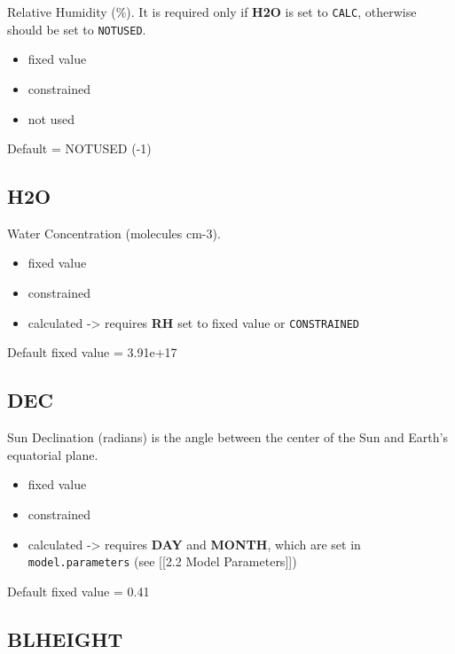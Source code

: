 Relative Humidity (\%). It is required only if \textbf{H2O} is set to
\texttt{CALC}, otherwise should be set to \texttt{NOTUSED}.

\begin{itemize}
\tightlist
\item
  fixed value
\item
  constrained
\item
  not used
\end{itemize}

Default = NOTUSED (-1)

\hypertarget{h2o}{%
\subsection{H2O}\label{h2o}}

Water Concentration (molecules cm-3).

\begin{itemize}
\tightlist
\item
  fixed value
\item
  constrained
\item
  calculated -\textgreater{} requires \textbf{RH} set to fixed value or
  \texttt{CONSTRAINED}
\end{itemize}

Default fixed value = 3.91e+17

\hypertarget{dec}{%
\subsection{DEC}\label{dec}}

Sun Declination (radians) is the angle between the center of the Sun and
Earth's equatorial plane.

\begin{itemize}
\tightlist
\item
  fixed value
\item
  constrained
\item
  calculated -\textgreater{} requires \textbf{DAY} and \textbf{MONTH},
  which are set in \texttt{model.parameters} (see {[}{[}2.2 Model
  Parameters{]}{]})
\end{itemize}

Default fixed value = 0.41

\hypertarget{blheight}{%
\subsection{BLHEIGHT}\label{blheight}}

